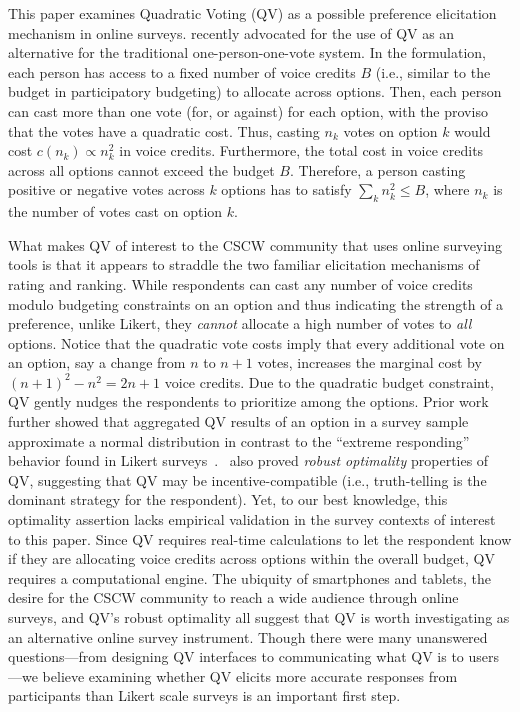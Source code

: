 {{This paper examines Quadratic Voting (QV) as a possible preference elicitation mechanism in online surveys. \textcite{posner2018radical} recently advocated for the use of QV as an alternative for the traditional one-person-one-vote system. In the \textcite{posner2018radical} formulation, each person has access to a fixed number of voice credits $B$ (i.e., similar to the budget in participatory budgeting) to allocate across options. Then, each person can cast more than one vote (for, or against) for each option, with the proviso that the votes have a quadratic cost. Thus, casting $n_k$ votes on option $k$ would cost $c(n_k) \propto n_k^2$ in voice credits. Furthermore, the total cost in voice credits across all options cannot exceed the budget $B$. Therefore, a person casting positive or negative votes across $k$ options has to satisfy $\sum_k n_k^2 \leqslant B$, where $n_k$ is the number of votes cast on option $k$. 

What makes QV of interest to the CSCW community that uses online surveying tools is that it appears to straddle the two familiar elicitation mechanisms of rating and ranking. While respondents can cast any number of voice credits modulo budgeting constraints on an option and thus indicating the strength of a preference, unlike Likert, they \textit{cannot} allocate a high number of votes to \textit{all} options. Notice that the quadratic vote costs imply that every additional vote on an option, say a change from $n$ to $n+1$ votes, increases the marginal cost by $(n+1)^2-n^2=2n+1$ voice credits. Due to the quadratic budget constraint, QV gently nudges the respondents to prioritize among the options. Prior work further showed that aggregated QV results of an option in a survey sample approximate a normal distribution in contrast to  the ``extreme responding'' behavior found in Likert surveys~\cite{quarfoot2017quadratic}.~\textcite{Lalley2018} also proved \textit{robust optimality} properties of QV, suggesting that QV may be incentive-compatible (i.e., truth-telling is the dominant strategy for the respondent). Yet, to our best knowledge, this optimality assertion lacks empirical validation in the survey contexts of interest to this paper. Since QV requires real-time calculations to let the respondent know if they are allocating voice credits across options within the overall budget, QV requires a computational engine. The ubiquity of smartphones and tablets, the desire for the CSCW community to reach a wide audience through online surveys, and QV's robust optimality all suggest that QV is worth investigating as an alternative online survey instrument. Though there were many unanswered questions---from designing QV interfaces to communicating what QV is to users---we believe examining whether QV elicits more accurate responses from participants than Likert scale surveys is an important first step.}}



